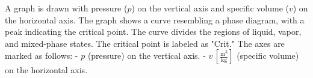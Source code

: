 A graph is drawn with pressure (\( p \)) on the vertical axis and specific volume (\( v \)) on the horizontal axis. The graph shows a curve resembling a phase diagram, with a peak indicating the critical point. The curve divides the regions of liquid, vapor, and mixed-phase states. The critical point is labeled as "Crit." The axes are marked as follows:  
- \( p \) (pressure) on the vertical axis.  
- \( v \, \left[\frac{\text{m}^3}{\text{kg}}\right] \) (specific volume) on the horizontal axis.